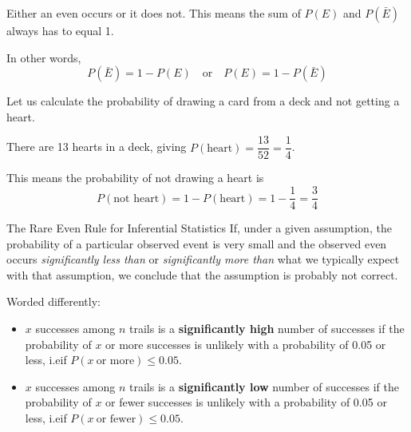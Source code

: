 \documentclass{beamer}
\newcommand{\prob}[1]{P\left(#1\right)}
\begin{document}
\begin{frame}
\begin{note}
Either an even occurs or it does not. This means the sum of $\prob{E}$ and $\prob{\bar{E}}$ always has to equal 1.

\vspace{2mm}
In other words,
\begin{equation*}
\prob{\bar{E}} = 1-\prob{E}
\quad\text{or}\quad
\prob{E} = 1-\prob{\bar{E}}
\end{equation*}
\end{note}\pause

\begin{example}
Let us calculate the probability of drawing a card from a deck and not getting a heart.\pause

\vspace{2mm}
There are 13 hearts in a deck, giving $\prob{\text{heart}}=\dfrac{13}{52}=\dfrac{1}{4}$.\pause

\vspace{2mm}
This means the probability of not drawing a heart is
\begin{equation*}
\prob{\text{not heart}} = 1 - \prob{\text{heart}} = 1-\dfrac{1}{4} = \dfrac{3}{4}
\end{equation*}
\end{example}
\end{frame}

\begin{frame}
\begin{block}{The Rare Even Rule for Inferential Statistics}
If, under a given assumption, the probability of a particular observed event is very small and the observed even occurs \emph{significantly less than} or \emph{significantly more than} what we typically expect with that assumption, we conclude that the assumption is probably not correct.\pause

\vspace{2mm}
Worded differently:
\begin{itemize}
\item $x$ successes among $n$ trails is a \textbf{significantly high} number of successes if the probability of $x$ or more successes is unlikely with a probability of 0.05 or less, i.e\@ if $\prob{x~\text{or more}}\leq 0.05$.
\item $x$ successes among $n$ trails is a \textbf{significantly low} number of successes if the probability of $x$ or fewer successes is unlikely with a probability of 0.05 or less, i.e\@ if $\prob{x~\text{or fewer}}\leq 0.05$.
\end{itemize}
\end{block}
\end{frame}
\end{document}
